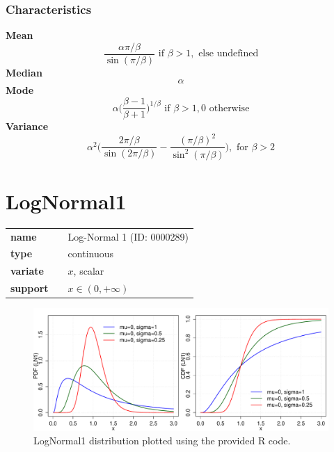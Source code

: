 \subsubsection*{Characteristics}
\smallskip \noindent \hspace{.2cm} \textbf{Mean} 
\begin{equation*}\frac{\alpha \pi/\beta}{\sin(\pi/\beta)} \text{ if } \beta>1, \text{ else undefined}\end{equation*}
\smallskip \noindent \hspace{.2cm} \textbf{Median} 
\begin{equation*}\alpha\end{equation*}
\smallskip \noindent \hspace{.2cm} \textbf{Mode} 
\begin{equation*}\alpha \Big(\frac{\beta-1}{\beta+1}\Big)^{1/\beta} \text{ if } \beta>1, 0 \text{ otherwise}\end{equation*}
\smallskip \noindent \hspace{.2cm} \textbf{Variance} 
\begin{equation*}\alpha^2 \Big(\frac{2\pi/\beta}{\sin(2\pi/\beta)} - \frac{(\pi/\beta)^2}{\sin^2(\pi/\beta)} \Big), \text{ for } \beta>2\end{equation*}
\smallskip
\section*{LogNormal1} 

  \bigskip 

\begin{tabular}{p{2cm}cl}
\textbf{name} & & Log-Normal 1 (ID: 0000289)\\ 
 
\textbf{type} & & continuous \\ 

\textbf{variate} & & $x$, scalar \\ 

\textbf{support} & & $x \in (0,+\infty)$
\end{tabular}

\begin{figure}[ht!]
\centering
  \includegraphics[width=140mm]{pics/LogNormal1.pdf}
 \caption{LogNormal1 distribution plotted using the provided R code.}
 \label{fig:LogNormal1}
\end{figure}

